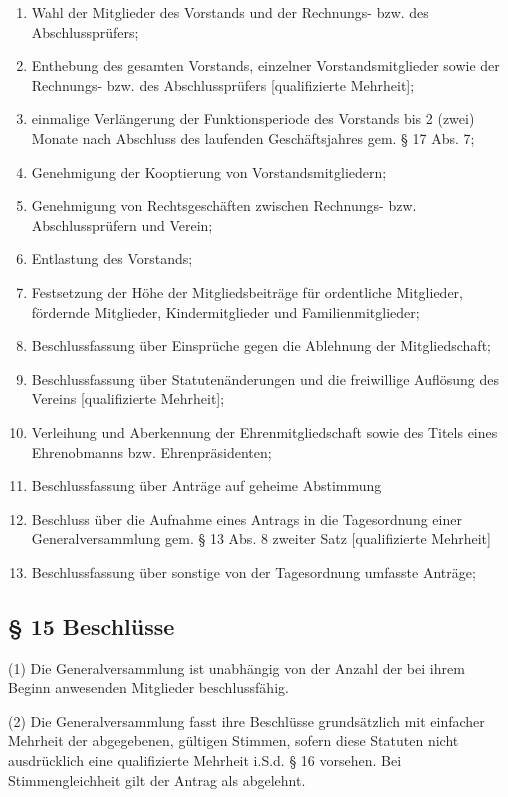 \documentclass[11pt,a4paper]{article}
\begin{document}
\begin{enumerate}[label=\alph*)]
\item
Wahl der Mitglieder des Vorstands und der Rechnungs- bzw. des Abschlussprüfers;
\item
Enthebung des gesamten Vorstands, einzelner Vorstandsmitglieder sowie der Rechnungs- bzw. des Abschlussprüfers [qualifizierte Mehrheit];
\item
einmalige Verlängerung der Funktionsperiode des Vorstands bis 2 (zwei) Monate nach Abschluss des laufenden Geschäftsjahres gem. § 17 Abs. 7;
\item
Genehmigung der Kooptierung von Vorstandsmitgliedern;
\item
Genehmigung von Rechtsgeschäften zwischen Rechnungs- bzw. Abschlussprüfern und Verein;
\item
Entlastung des Vorstands;
\item
Festsetzung der Höhe der Mitgliedsbeiträge für ordentliche Mitglieder, fördernde Mitglieder, Kindermitglieder und Familienmitglieder;
\item
Beschlussfassung über Einsprüche gegen die Ablehnung der Mitgliedschaft;
\item
Beschlussfassung über Statutenänderungen und die freiwillige Auflösung des Vereins [qualifizierte Mehrheit];
\item
Verleihung und Aberkennung der Ehrenmitgliedschaft sowie des Titels eines Ehrenobmanns bzw. Ehrenpräsidenten;
\item
Beschlussfassung über Anträge auf geheime Abstimmung
\item
Beschluss über die Aufnahme eines Antrags in die Tagesordnung einer Generalversammlung gem. § 13 Abs. 8 zweiter Satz [qualifizierte Mehrheit]
\item
Beschlussfassung über sonstige von der Tagesordnung umfasste Anträge;
\end{enumerate}

\subsection{§ 15
Beschlüsse}

(1)
Die Generalversammlung ist unabhängig von der Anzahl der bei ihrem Beginn anwesenden Mitglieder beschlussfähig.

(2)
Die Generalversammlung fasst ihre Beschlüsse grundsätzlich mit einfacher Mehrheit der abgegebenen, gültigen Stimmen, sofern diese Statuten nicht ausdrücklich eine qualifizierte Mehrheit i.S.d. § 16 vorsehen.
Bei Stimmengleichheit gilt der Antrag als abgelehnt.
\end{document}
